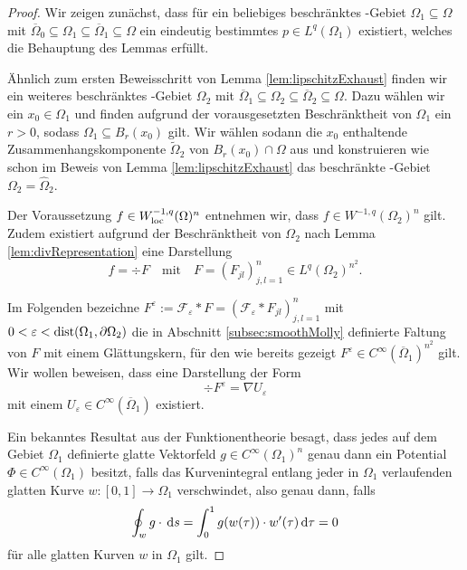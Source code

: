 \begin{proof}
  Wir zeigen zunächst, dass für ein beliebiges beschränktes \lipschitz\hyp{}Gebiet $\Omega_1 \subseteq \Omega$ mit $\overline\Omega_0 \subseteq \Omega_1 \subseteq \overline\Omega_1 \subseteq \Omega$ ein eindeutig bestimmtes $p \in L^q(\Omega_1)$ existiert, welches die Behauptung des Lemmas erfüllt.

  Ähnlich zum ersten Beweisschritt von Lemma \ref{lem:lipschitzExhaust} finden wir ein weiteres beschränktes \lipschitz\hyp{}Gebiet $\Omega_2$ mit $\overline\Omega_1 \subseteq \Omega_2 \subseteq \overline\Omega_2 \subseteq \Omega$.
  Dazu wählen wir ein $x_0 \in \Omega_1$ und finden aufgrund der vorausgesetzten Beschränktheit von $\Omega_1$ ein $r > 0$, sodass $\Omega_1 \subseteq B_r(x_0)$ gilt.
  Wir wählen sodann die $x_0$ enthaltende Zusammenhangskomponente $\widetilde\Omega_2$ von $B_r(x_0) \cap \Omega$ aus und konstruieren wie schon im Beweis von Lemma \ref{lem:lipschitzExhaust} das beschränkte \lipschitz\hyp{}Gebiet $\Omega_2 = \widehat\Omega_2$.

  Der Voraussetzung $f \in W_{\operatorname{loc}}^{-1,q}(\Omega)^n$ entnehmen wir, dass $f \in W^{-1,q}(\Omega_2)^n$ gilt. Zudem existiert aufgrund der Beschränktheit von $\Omega_2$ nach Lemma \ref{lem:divRepresentation} eine Darstellung
  $$
  f = \div F \quad\text{mit}\quad F = (F_{jl})_{j,l=1}^n \in L^q(\Omega_2)^{n^2}.
  $$

  Im Folgenden bezeichne $F^\varepsilon := \mathcal{F}_\varepsilon \ast F = (\mathcal{F}_\varepsilon \ast F_{jl})_{j,l=1}^n$ mit $0 < \varepsilon < \operatorname{dist}(\Omega_1, \partial\Omega_2)$ die in Abschnitt \ref{subsec:smoothMolly} definierte Faltung von $F$ mit einem Glättungskern, für den wie bereits gezeigt $F^\varepsilon \in C^\infty(\overline\Omega_1)^{n^2}$ gilt.
  Wir wollen beweisen, dass eine Darstellung der Form
  $$
  \div F^\varepsilon = \nabla U_\varepsilon
  $$
  mit einem $U_\varepsilon \in C^\infty(\overline\Omega_1)$ existiert.

  Ein bekanntes Resultat aus der Funktionentheorie besagt, dass jedes auf dem Gebiet $\Omega_1$ definierte glatte Vektorfeld $g \in C^\infty(\Omega_1)^n$ genau dann ein Potential $\Phi \in C^\infty(\Omega_1)$ besitzt, falls das Kurvenintegral entlang jeder in $\Omega_1$ verlaufenden glatten Kurve $w \colon [0,1] \to \Omega_1$ verschwindet, also genau dann, falls
  $$
  \oint_w g \cdot \, {\operatorname{d}\!{s}} = \int_0^1 g(w(\tau))\cdot w'(\tau) \, {\operatorname{d}\!{\tau}} = 0
  $$
  für alle glatten Kurven $w$ in $\Omega_1$ gilt.


\end{proof}
